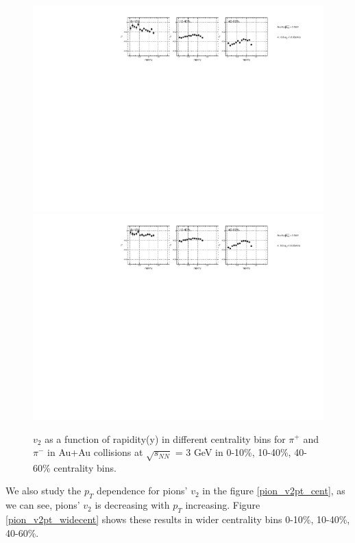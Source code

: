 \begin{figure}[h]
\includegraphics[scale=0.6]{chapter3/fig/v2ypikp/pionp_v2y_wide_cent.pdf}
\includegraphics[scale=0.6]{chapter3/fig/v2ypikp/pionm_v2y_wide_cent.pdf}
\caption{\label{pion_v2y_widecent} $v_{2}$ as a function of rapidity(y) in different centrality bins for $\pi^{+}$ and $\pi^{-}$ in Au+Au collisions at $\sqrt{s_{NN}}$ = 3 GeV in 0-10\%, 10-40\%, 40-60\% centrality bins.}
\end{figure}

We also study the $p_{T}$ dependence for pions' $v_{2}$ in the figure \ref{pion_v2pt_cent}, as we can see, pions' $v_{2}$ is decreasing with $p_{T}$ increasing. Figure \ref{pion_v2pt_widecent} shows these results in wider centrality bins 0-10\%, 10-40\%, 40-60\%. 


